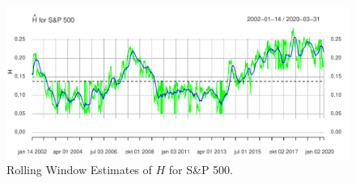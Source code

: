 \begin{figure}[H]
    \centering
    \includegraphics[scale=0.71]{fig/img/RealizedLib/rolling_H_75.pdf}
    \caption{Rolling Window Estimates of $H$ for S\&P 500.}
    \label{fig:fedfgrafmand}
\end{figure}
